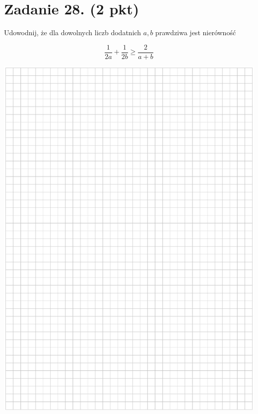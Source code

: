 \documentclass[10pt]{article}
\begin{document}
\section*{Zadanie 28. (2 pkt)}
Udowodnij, że dla dowolnych liczb dodatnich \(a, b\) prawdziwa jest nierówność

\[
\frac{1}{2 a}+\frac{1}{2 b} \geq \frac{2}{a+b}
\]

\begin{center}
\includegraphics[max width=\textwidth]{2024_11_21_9383c97fb44abf35abe9g-16}
\end{center}
\end{document}

